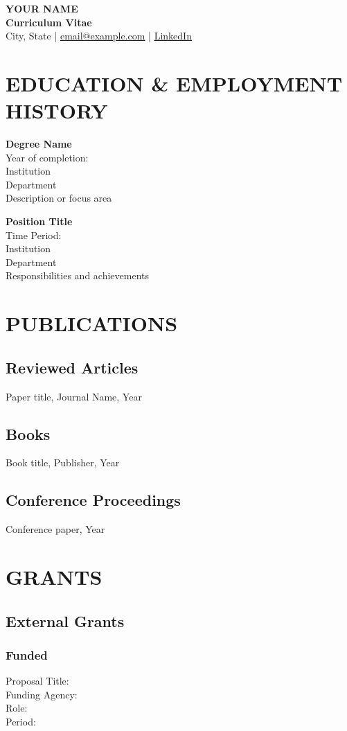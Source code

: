 \documentclass[a4paper,9pt]{extarticle}
\newenvironment{subs}
  {\adjustwidth{2em}{0pt}}
  {\endadjustwidth}
\begin{document}
\pagestyle{empty}

\begin{center}
    \textbf{\Large YOUR NAME}\\[3pt]
    \textbf{Curriculum Vitae}\\[1pt]
    City, State | \href{email@example.com}{email@example.com} | \href{https://linkedin.com/in/username}{LinkedIn}
\end{center}

\section*{EDUCATION \& EMPLOYMENT HISTORY}
    \textbf{Degree Name} \\
    Year of completion: \\
    Institution \\
    Department \\
    Description or focus area

    \textbf{Position Title} \\
    Time Period: \\
    Institution \\
    Department \\
    Responsibilities and achievements

\section*{PUBLICATIONS}
    \subsection*{Reviewed Articles}
        \item Paper title, Journal Name, Year
    \subsection*{Books}
        \item Book title, Publisher, Year
    \subsection*{Conference Proceedings}
        \item Conference paper, Year

\section*{GRANTS}
    \subsection*{External Grants}
    \begin{subs}
        \subsubsection*{Funded}
            Proposal Title: \\
            Funding Agency: \\
            Role: \\
            Period:
    \end{subs}
\end{document}
